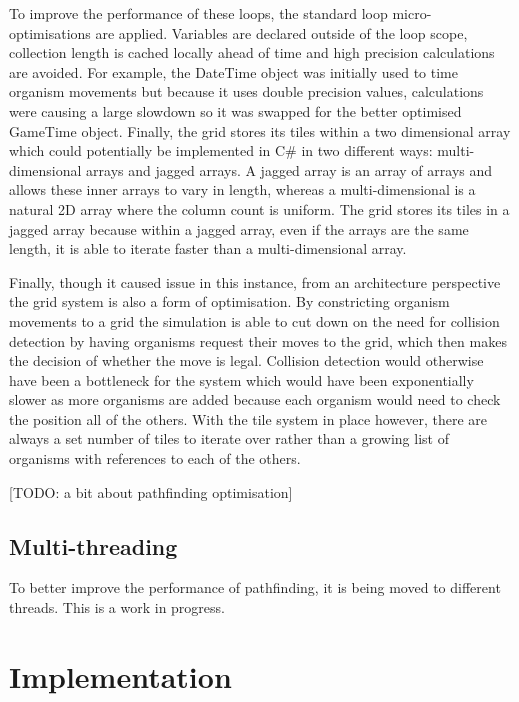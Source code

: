 \documentclass[a4paper, oneside, 11pt]{report}
\begin{document}
To improve the performance of these loops, the standard loop micro-optimisations are applied. Variables are declared outside of the loop scope, collection length is cached locally ahead of time and high precision calculations are avoided. For example, the DateTime object was initially used to time organism movements but because it uses double precision values, calculations were causing a large slowdown so it was swapped for the better optimised GameTime object. Finally, the grid stores its tiles within a two dimensional array which could potentially be implemented in C\# in two different ways: multi-dimensional arrays and jagged arrays. A jagged array is an array of arrays and allows these inner arrays to vary in length, whereas a multi-dimensional is a natural 2D array where the column count is uniform. The grid stores its tiles in a jagged array because within a jagged array, even if the arrays are the same length, it is able to iterate faster than a multi-dimensional array.

Finally, though it caused issue in this instance, from an architecture perspective the grid system is also a form of optimisation. By constricting organism movements to a grid the simulation is able to cut down on the need for collision detection by having organisms request their moves to the grid, which then makes the decision of whether the move is legal. Collision detection would otherwise have been a bottleneck for the system which would have been exponentially slower as more organisms are added because each organism would need to check the position all of the others. With the tile system in place however, there are always a set number of tiles to iterate over rather than a growing list of organisms with references to each of the others.

[TODO: a bit about pathfinding optimisation]

\section{Multi-threading}
To better improve the performance of pathfinding, it is being moved to different threads. This is a work in progress.

\chapter{Implementation} \label{implementation}
\end{document}
